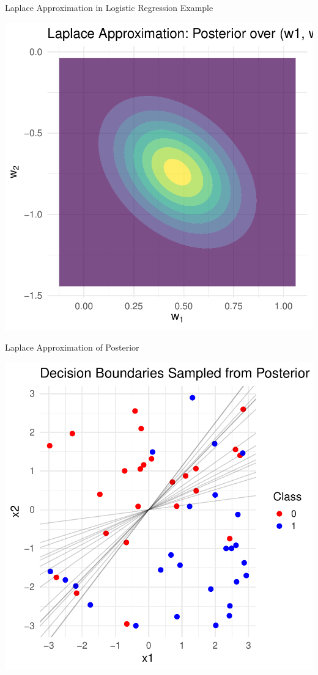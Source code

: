 \documentclass{beamer}
\begin{document}
\begin{frame}{Laplace Approximation in Logistic Regression Example}

\begin{center}
  \includegraphics[width=0.6\linewidth]{laplace_posterior_contours.pdf}
\end{center}

\end{frame}

\begin{frame}{Laplace Approximation of Posterior}

\begin{center}
  \includegraphics[width=0.6\linewidth]{laplace_decision_boundaries.pdf}
\end{center}

\end{frame}
\end{document}
